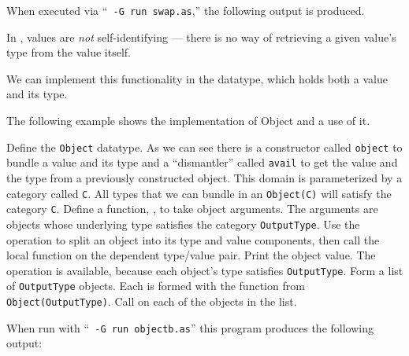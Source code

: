 When executed via ``{\tt \asharpcmd{} -G run swap.as},'' the following
output is produced.
{\small

}

\newpage
{}

In \asharp{}, values are {\sl not\/} self-identifying --- there is no way
of retrieving a given value's type from the value itself.  

We can implement this functionality in the 
datatype, which holds both a value and its type.

The following example shows the implementation of Object and a use of it.


\begin{description}
   Define the \verb+Object+ datatype. As we can see there is a constructor
   called \verb+object+ to bundle a value and its type and a ``dismantler''
   called \verb+avail+ to get the value and the type from a previously
   constructed object. This domain is parameterized by a category called
   \verb+C+. All types that we can bundle in an \verb+Object(C)+ will
   satisfy the category \verb+C+.
   Define a function, , to take object arguments.
   The arguments are objects whose underlying type satisfies the
   category \verb"OutputType".
   Use the  operation to split an object into its type
   and value components, then call the local function 
   on the dependent type/value pair.
   Print the object value.  The \ttin{<<} operation is available,
   because each object's type satisfies \verb"OutputType".
   Form a list of \verb"OutputType" objects.  Each is formed with the
    function from \verb"Object(OutputType)".
   Call  on each of the objects in the list.
\end{description}

When run with ``{\tt \asharpcmd{} -G run objectb.as}'' this program
produces the following output:
{\small

}

